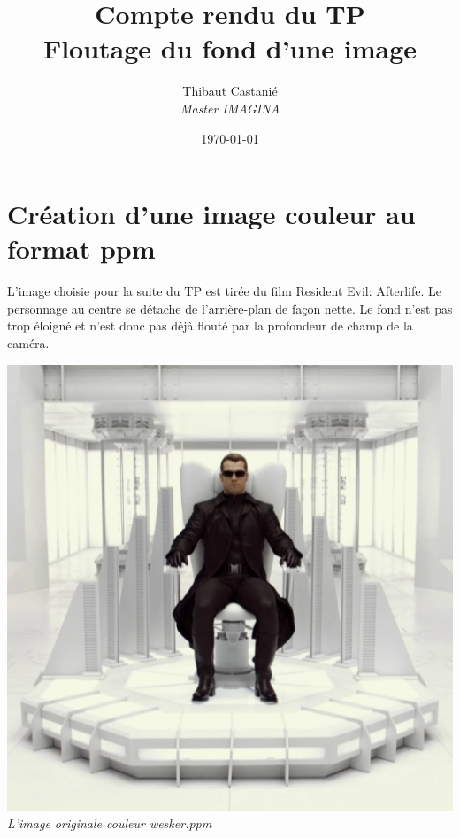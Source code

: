 \documentclass[a4paper,11pt]{article}
\begin{document}
\title{\textbf{Compte rendu du TP }\\Floutage du fond d'une image}
\author{Thibaut Castanié\\\textit{Master IMAGINA}}
\date{\today}

\maketitle
\thispagestyle{empty}

\newpage 

\section{Création d'une image couleur au format ppm}
L'image choisie pour la suite du TP est tirée du film Resident Evil: Afterlife. Le personnage au centre se détache de l'arrière-plan de façon nette. Le fond n'est pas trop éloigné et n'est donc pas déjà flouté par la profondeur de champ de la caméra.
\begin{center}
\includegraphics[scale=0.7]{wesker.png}\\
\textit{L'image originale couleur wesker.ppm}
\end{center}
\newpage
\end{document}
